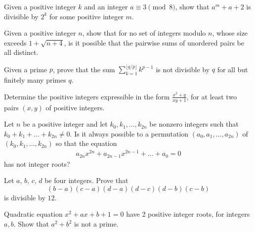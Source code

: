 \documentclass[problems.tex]{subfile}
\begin{document}
	\begin{problem}
		Given a positive integer $k$ and an integer $a \equiv 3 \pmod 8$, show that $a^m + a + 2$ is divisible by $2^k$ for some positive integer $m$.
	\end{problem}

	\begin{problem}
		Given a positive integer $n$, show that for no set of integers modulo $n$, whose size exceeds $1 + \sqrt{n + 4}$, is it possible that the pairwise sums of unordered pairs be all distinct.
	\end{problem}

	\begin{problem}
		Given a prime $p$, prove that the sum $\sum\limits_{k=1}^{\lfloor q/p \rfloor}{k^{p-1}}$ is not divisible by $q$ for all but finitely many primes $q$. %
	\end{problem}

	\begin{problem}
		Determine the positive integers expressible in the form $\frac{x^2+y}{xy+1}$, for at least two pairs $(x,y)$ of positive integers. %
	\end{problem}

	\begin{problem}
		Let $n$ be a positive integer and let $k_0,k_1, \dots,k_{2n}$ be nonzero integers such that $k_0+k_1 +\dots+k_{2n}\neq 0$. Is it always possible to a permutation $(a_0,a_1,\dots,a_{2n})$ of $(k_0,k_1,\dots,k_{2n})$ so that the equation
		\begin{align*} a_{2n}x^{2n}+a_{2n-1}x^{2n-1}+\dots+a_0=0 \end{align*}has not integer roots? %
	\end{problem}

	\begin{problem}
		Let $a$, $b$, $c$, $d$ be four integers. Prove that $$\left(b-a\right)\left(c-a\right)\left(d-a\right)\left(d-c\right)\left(d-b\right)\left(c-b\right)$$is divisible by $12$. %
	\end{problem}

	\begin{problem}
		Quadratic equation $ x^2+ax+b+1=0$ have 2 positive integer roots, for integers $ a,b$. Show that $ a^2+b^2$ is not a prime. %
	\end{problem}
\end{document}
